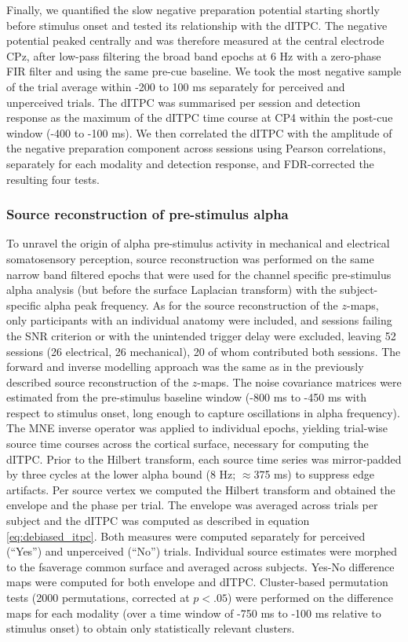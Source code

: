 \documentclass[11pt,a4paper,onecolumn]{article}
\begin{document}
Finally, we quantified the slow negative preparation potential starting shortly before stimulus onset and tested its relationship with the dITPC. 
The negative potential peaked centrally and was therefore measured at the central electrode CPz, after low-pass filtering the broad band epochs at 6 Hz with a zero-phase FIR filter and using the same pre-cue baseline. 
We took the most negative sample of the trial average within -200 to 100 ms separately for perceived and unperceived trials. 
The dITPC was summarised per session and detection response as the maximum of the dITPC time course at CP4 within the post-cue window (-400 to -100 ms). 
We then correlated the dITPC with the amplitude of the negative preparation component across sessions using Pearson correlations, separately for each modality and detection response, and FDR-corrected the resulting four tests. 

\subsubsection*{Source reconstruction of pre-stimulus alpha}
\vspace{-7pt}

To unravel the origin of alpha pre-stimulus activity in mechanical and electrical somatosensory perception, source reconstruction was performed on the same narrow band filtered epochs that were used for the channel specific pre-stimulus alpha analysis (but before the surface Laplacian transform) with the subject-specific alpha peak frequency.
As for the source reconstruction of the $z$-maps, only participants with an individual anatomy were included, and sessions failing the SNR criterion or with the unintended trigger delay were excluded, leaving 52 sessions (26 electrical, 26 mechanical), 20 of whom contributed both sessions.
The forward and inverse modelling approach was the same as in the previously described source reconstruction of the $z$-maps. The noise covariance matrices were estimated from the pre-stimulus baseline window (-800 ms to -450 ms with respect to stimulus onset, long enough to capture oscillations in alpha frequency). The MNE inverse operator was applied to individual epochs, yielding trial-wise source time courses across the cortical surface, necessary for computing the dITPC. 
Prior to the Hilbert transform, each source time series was mirror-padded by three cycles at the lower alpha bound (8 Hz; $\approx$375 ms) to suppress edge artifacts. 
Per source vertex we computed the Hilbert transform and obtained the envelope and the phase per trial. The envelope was averaged across trials per subject and the dITPC was computed as described in equation \ref{eq:debiased_itpc}.
Both measures were computed separately for perceived (``Yes'') and unperceived (``No'') trials. Individual source estimates were morphed to the fsaverage common surface and averaged across subjects. 
Yes-No difference maps were computed for both envelope and dITPC.
Cluster-based permutation tests (2000 permutations, corrected at $p < .05$) were performed on the difference maps for each modality (over a time window of -750 ms to -100 ms relative to stimulus onset) to obtain only statistically relevant clusters.
\end{document}
